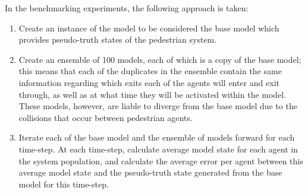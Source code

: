\documentclass{article}
\begin{document}
In the benchmarking experiments, the following approach is taken:
\begin{enumerate}
	\item Create an instance of the model to be considered the base model which
	provides pseudo-truth states of the pedestrian system.
	\item Create an ensemble of 100 models, each of which is a copy of the base
	model; this means that each of the duplicates in the ensemble contain
	the same information regarding which exits each of the agents will enter
	and exit through, as well as at what time they will be activated within
	the model. These models, however, are liable to diverge from the base
	model due to the collisions that occur between pedestrian agents.
	\item Iterate each of the base model and the ensemble of models forward for
	each time-step. At each time-step, calculate average model state for
	each agent in the system population, and calculate the average error per
	agent between this average model state and the pseudo-truth state
	generated from the base model for this time-step.
\end{enumerate}



\end{document}
